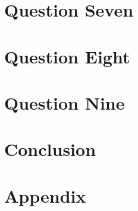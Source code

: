 \documentclass[12pt,a4paper]{report}
\begin{document}
\chapter{Question Seven}


\chapter{Question Eight}


\chapter{Question Nine}


\chapter{Conclusion}


\chapter{Appendix}


\printbibliography
\end{document}
